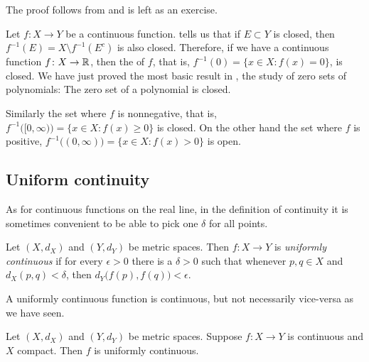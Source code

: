 The proof follows from  and is left as
an exercise.

\begin{example}
Let $f \colon X \to Y$ be a continuous function.
 tells us that if $E \subset Y$ is closed, then 
$f^{-1}(E) = X \setminus f^{-1}(E^c)$ is also closed.  Therefore, if
we have a continuous
function $f \colon X \to {\mathbb{R}}$, then the
\emph{} of $f$, that is, 
$f^{-1}(0) = \{ x \in X :
f(x) = 0 \}$, is closed.  We have just proved the most basic result in
\emph{}, the study of
zero sets of polynomials:  The zero set of a polynomial is closed.

Similarly the set where $f$ is nonnegative, that is,
$f^{-1}\bigl( [0,\infty) \bigr) = \{ x \in X :
f(x) \geq 0 \}$ is closed.  On the other hand the
set where $f$ is positive,
$f^{-1}\bigl( (0,\infty) \bigr) = \{ x \in X :
f(x) > 0 \}$ is open.  
\end{example}

\subsection{Uniform continuity}

As for continuous
functions on the real line, in the definition of continuity
it is sometimes convenient to be able to pick
one $\delta$ for all points.

\begin{defn}
Let $(X,d_X)$ and $(Y,d_Y)$ be metric spaces.
Then $f \colon X \to Y$ is
\emph{uniformly continuous}
if for every $\epsilon > 0$
there is a $\delta > 0$ such that whenever $p,q \in X$ and $d_X(p,q) <
\delta$, then
$d_Y\bigl(f(p),f(q)\bigr) < \epsilon$.
\end{defn}

A uniformly continuous function is continuous, but not necessarily
vice-versa as we have seen.

\begin{thm} \label{thm:Xcompactfunifcont}
Let $(X,d_X)$ and $(Y,d_Y)$ be metric spaces.
Suppose $f \colon X \to Y$ is continuous and $X$ compact.  Then
$f$ is uniformly continuous.
\end{thm}


